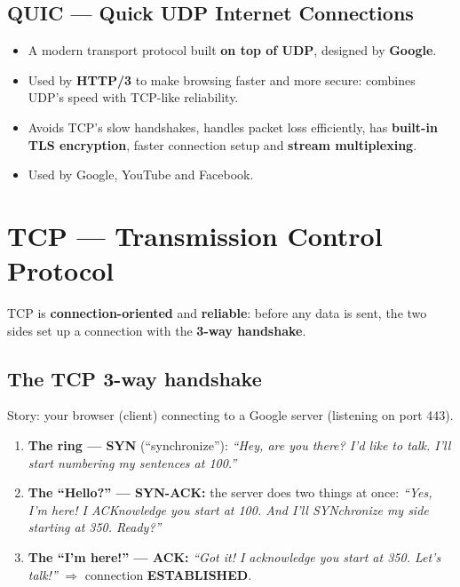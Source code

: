 \subsection{QUIC --- Quick UDP Internet Connections}
\begin{itemize}
  \item A modern transport protocol built \textbf{on top of UDP}, designed by \textbf{Google}.
  \item Used by \textbf{HTTP/3} to make browsing faster and more secure: combines UDP's speed with TCP-like reliability.
  \item Avoids TCP's slow handshakes, handles packet loss efficiently, has \textbf{built-in TLS encryption}, faster connection setup and \textbf{stream multiplexing}.
  \item Used by Google, YouTube and Facebook.
\end{itemize}

\section{TCP --- Transmission Control Protocol}
TCP is \textbf{connection-oriented} and \textbf{reliable}: before any data is sent, the two sides set up a connection with the \textbf{3-way handshake}.

\subsection{The TCP 3-way handshake}
Story: your browser (client) connecting to a Google server (listening on port 443).

\begin{center}
\end{center}

\begin{enumerate}
  \item \textbf{The ring --- SYN} (``synchronize''): \emph{``Hey, are you there? I'd like to talk. I'll start numbering my sentences at 100.''}
  \item \textbf{The ``Hello?'' --- SYN-ACK:} the server does two things at once: \emph{``Yes, I'm here! I ACKnowledge you start at 100. And I'll SYNchronize my side starting at 350. Ready?''}
  \item \textbf{The ``I'm here!'' --- ACK:} \emph{``Got it! I acknowledge you start at 350. Let's talk!''} $\Rightarrow$ connection \textbf{ESTABLISHED}.
\end{enumerate}

